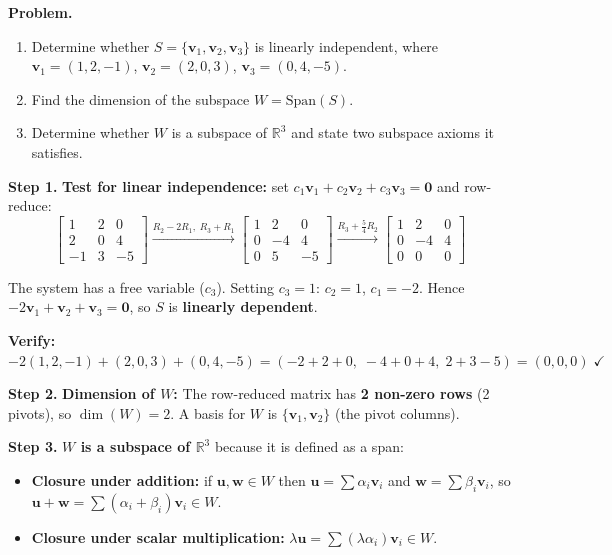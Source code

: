 \documentclass[12pt,a4paper]{article}
\newcommand{\step}[1]{\noindent\textbf{Step #1.}\;}
\newcommand{\R}{\mathbb{R}}
\newcommand{\mat}[1]{\begin{bmatrix}#1\end{bmatrix}}
\begin{document}
	\begin{tcolorbox}[worked]
		\textbf{Problem.}
		\begin{enumerate}[label=(\alph*), nosep]
			\item Determine whether $S = \{\mathbf{v}_1, \mathbf{v}_2, \mathbf{v}_3\}$ is linearly independent, where
			$\mathbf{v}_1=(1,2,-1)$, $\mathbf{v}_2=(2,0,3)$, $\mathbf{v}_3=(0,4,-5)$.
			\item Find the dimension of the subspace $W = \text{Span}(S)$.
			\item Determine whether $W$ is a subspace of $\R^3$ and state two subspace axioms it satisfies.
		\end{enumerate}
		
		\step{1} \textbf{Test for linear independence:} set $c_1\mathbf{v}_1+c_2\mathbf{v}_2+c_3\mathbf{v}_3=\mathbf{0}$ and row-reduce:
		\[
		\mat{1&2&0\\2&0&4\\-1&3&-5} \xrightarrow{R_2-2R_1,\;R_3+R_1}
		\mat{1&2&0\\0&-4&4\\0&5&-5} \xrightarrow{R_3+\frac{5}{4}R_2}
		\mat{1&2&0\\0&-4&4\\0&0&0}
		\]
		
		The system has a free variable ($c_3$). Setting $c_3 = 1$: $c_2 = 1$, $c_1 = -2$.
		Hence $-2\mathbf{v}_1 + \mathbf{v}_2 + \mathbf{v}_3 = \mathbf{0}$, so $S$ is \textbf{linearly dependent}.
		
		\textbf{Verify:} $-2(1,2,-1)+(2,0,3)+(0,4,-5)=(-2+2+0,\;-4+0+4,\;2+3-5)=(0,0,0)\;\checkmark$
		
		\step{2} \textbf{Dimension of $W$:} The row-reduced matrix has \textbf{2 non-zero rows} (2 pivots), so
		$\dim(W) = 2$. A basis for $W$ is $\{\mathbf{v}_1, \mathbf{v}_2\}$ (the pivot columns).
		
		\step{3} \textbf{$W$ is a subspace of $\R^3$} because it is defined as a span:
		\begin{itemize}[nosep]
			\item \textbf{Closure under addition:} if $\mathbf{u}, \mathbf{w} \in W$ then $\mathbf{u}=\sum\alpha_i\mathbf{v}_i$ and $\mathbf{w}=\sum\beta_i\mathbf{v}_i$, so $\mathbf{u}+\mathbf{w}=\sum(\alpha_i+\beta_i)\mathbf{v}_i\in W$.
			\item \textbf{Closure under scalar multiplication:} $\lambda\mathbf{u}=\sum(\lambda\alpha_i)\mathbf{v}_i\in W$.
		\end{itemize}
	\end{tcolorbox}
	
\end{document}
